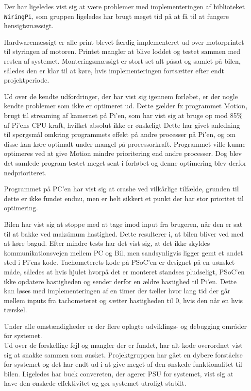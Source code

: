 Der har ligeledes vist sig at være problemer med implementeringen af biblioteket \texttt{WiringPi}, som gruppen ligeledes har brugt meget tid på at få til at fungere hensigtsmæssigt.

Hardwaremæssigt er alle print blevet færdig implementeret ud over motorprintet til styringen af motoren. 
Printet mangler at blive loddet og testet sammen med resten af systemet.
Monteringsmæssigt er stort set alt påsat og samlet på bilen, således den er klar til at køre, hvis implementeringen fortsætter efter endt projektperiode.

Ud over de kendte udfordringer, der har vist sig igennem forløbet, er der nogle kendte problemer som ikke er optimeret ud. 
Dette gælder fx programmet Motion, brugt til streaming af kameraet på Pi'en, som har vist sig at bruge op mod 85\% af Pi'ens CPU-kraft, hvilket absolut ikke er ønskeligt
Dette har givet anledning til spørgsmål omkring programmets effekt på andre processer på Pi'en, og om disse kan køre optimalt under mangel på processorkraft. 
Programmet ville kunne optimeres ved at give Motion mindre prioritering end andre processer. 
Dog blev det samlede program testet meget sent i forløbet og denne optimering blev derfor nedprioriteret.

Programmet på PC'en har vist sig at crashe ved vilkårlige tilfælde, grunden til dette er ikke fundet endnu, men er helt sikkert et punkt der har stor prioritet til optimering.

Bilen har vist sig at stoppe med at tage imod input fra brugeren, når den er sat til at bakke ved maksimum hastighed. Dette resulterer i, at bilen bliver ved med at køre bagud. Efter mindre tests har det vist sig, at det ikke skyldes kommunikationsvejen mellem PC og Bil, men sandsynligvis ligger gemt et andet sted i Pi'ens kode. Tachometerets kode på PSoC'en er designet på en uønsket måde, således at hvis hjulet hvorpå det er monteret standses pludseligt, PSoC'en ikke opdatere hastigheden og sender derfor en ældre hastighed til Pi'en. Dette kan løses med implementeringen af en timer der tæller hvor lang tid der går mellem inputs fra tachometeret og sætter hastigheden til 0, hvis den når en hvis tærskel.

Under alle omstændigheder er der flere oplagte udviklings- og debugging områder for systemet.\\

Ud over de forskellige fejl og mangler der er fundet, har alt kode overordnet vist sig at snakke sammen som ønsket. Projektgruppen har gået en dybere forståelse for systemet og det har endt ud i at give meget af den ønskede funktionalitet til bilen.
Ligeledes har buck convereten, der agerer PSU for systemet, vist sig at have den ønskede effektivitet og gør systemet utroligt stabilt.

\clearpage